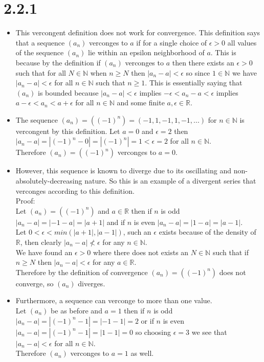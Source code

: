\documentclass{article}
\begin{document}
\section*{2.2.1}
\begin{center}
    \doublespacing
    \begin{itemize}
        \item This vercongent definition does not work for convergence. This definition says that a sequence $(a_n)$ verconges to $a$ if for a single choice of $\epsilon > 0$ all values of the sequence $(a_n)$ lie within an epsilon neighborhood of $a$. This is because by the definition if $(a_n)$ verconges to $a$ then there exists an $\epsilon > 0$ such that for all $N\in\mathbb{N}$ when $n\geq N$ then $|a_n - a| <\epsilon$ so since $1\in\mathbb{N}$ we have $|a_n - a| <\epsilon$ for all $n\in\mathbb{N}$ such that $n\geq 1$. This is essentially saying that $(a_n)$ is bounded because $|a_n - a| <\epsilon$ implies $-\epsilon < a_n - a <\epsilon$ implies $a -\epsilon < a_n < a +\epsilon$ for all $n\in\mathbb{N}$ and some finite $a,\epsilon\in\mathbb{R}$.
        \item The sequence $(a_n) = ((-1)^n) = (-1, 1, -1, 1, -1, ...)$ for $n\in\mathbb{N}$ is vercongent by this definition. Let $a = 0$ and $\epsilon = 2$ then $|a_n - a| = |(-1)^n - 0| = |(-1)^n| = 1 <\epsilon = 2$ for all $n\in\mathbb{N}$.
        \\Therefore $(a_n) = ((-1)^n)$ verconges to $a = 0$.
        \item However, this sequence is known to diverge due to its oscillating and non-absolutely-decreasing nature. So this is an example of a divergent series that verconges according to this definition.
        \\Proof:
        \\Let $(a_n) = ((-1)^n)$ and $a\in\mathbb{R}$ then if $n$ is odd $|a_n - a| = |-1 - a| = |a + 1|$ and if $n$ is even $|a_n - a| = |1 - a| = |a - 1|$.
        \\Let $0 < \epsilon < min(|a + 1|, |a - 1|)$, such an $\epsilon$ exists because of the density of $\mathbb{R}$, then clearly $|a_n - a|\not < \epsilon$ for any $n\in\mathbb{N}$.
        \\We have found an $\epsilon > 0$ where there does not exists an $N\in\mathbb{N}$ such that if $n\geq N$ then $|a_n - a| <\epsilon$ for any $a\in\mathbb{R}$.
        \\Therefore by the definition of convergence $(a_n) = ((-1)^n)$ does not converge, so $(a_n)$ diverges.
        \item Furthermore, a sequence can verconge to more than one value.
        \\Let $(a_n)$ be as before and $a = 1$ then if $n$ is odd $|a_n - a| = |(-1)^n - 1| = |-1 - 1| = 2$ or if $n$ is even $|a_n - a| = |(-1)^n - 1| = |1 - 1| = 0$ so choosing $\epsilon = 3$ we see that $|a_n - a| <\epsilon$ for all $n\in\mathbb{N}$.
        \\Therefore $(a_n)$ verconges to $a = 1$ as well.
    \end{itemize}
\end{center}
\end{document}
